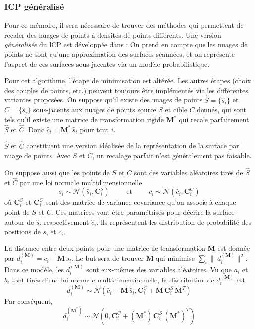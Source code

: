 \documentclass[a4paper,10pt]{scrreprt}
\begin{document}
\subsubsection{ICP généralisé}
Pour ce mémoire, il sera nécessaire de trouver des méthodes qui permettent de recaler des nuages de points à densités de points différents. Une version \emph{généralisée} du ICP est développée dans \cite{Sega2009}: On prend en compte que les nuages de points ne sont qu'une approximation des surfaces scannées, et on représente l'aspect de ces surfaces sous-jacentes via un modèle probabilistique.

Pour cet algorithme, l'étape de minimisation est altérée. Les autres étapes (choix des couples de points, etc.) peuvent toujours être implémentés via les différentes variantes proposées. On suppose qu'il existe des nuages de points $\hat{S} = \{ \hat{s}_i \}$ et $\hat{C} = \{ \hat{s}_i \}$ sous-jacents aux nuages de points source $S$ et cible $C$ donnés, qui sont tels qu'il existe une matrice de transformation rigide $\mathbf{M}^*$ qui recale parfaitement $\hat{S}$ et $\hat{C}$. Donc $\hat{c}_i = \mathbf{M}^* \, \hat{s}_i$ pour tout $i$.

$\hat{S}$ et $\hat{C}$ constituent une version idéalisée de la représentation de la surface par nuage de points. Avec $S$ et $C$, un recalage parfait n'est généralement pas faisable.

On suppose aussi que les points de $S$ et $C$ sont des variables aléatoires tirés de $\hat{S}$ et $\hat{C}$ par une loi normale multidimensionnelle
\begin{equation}
	s_i \sim \mathcal{N}(\hat{s}_i, \mathbf{C}^S_i)
	\hspace{1cm} \text{et} \hspace{1cm}
	c_i \sim \mathcal{N}(\hat{c}_i, \mathbf{C}^C_i)
\end{equation}
où $\mathbf{C}^S_i$ et $\mathbf{C}^C_i$ sont des matrice de variance-covariance qu'on associe à chaque point de $S$ et $C$. Ces matrices vont être paramétrisés pour décrire la surface autour de $\hat{s}_i$ respectivement $\hat{c}_i$. Ils représentent les distribution de probabilité des positions de $s_i$ et $c_i$.

La distance entre deux points pour une matrice de transformation $\mathbf{M}$ est donnée par $d^{(\mathbf{M})}_i = c_i - \mathbf{M} \, s_i$. Le but sera de trouver $\mathbf{M}$ qui minimise $\sum_{i} \|\ d^{(\mathbf{M})}_i \|^2$. Dans ce modèle, les $d^{(\mathbf{M})}_i$ sont eux-mêmes des variables aléatoires. Vu que $a_i$ et $b_i$ sont tirés d'une loi normale multidimensionnelle, la distribution de $d^{(\mathbf{M})}_i$ est
\begin{equation} \label{eq:dist_distr}
	d^{(\mathbf{M})}_i \sim \mathcal{N}(\hat{c}_i - \mathbf{M}\,\hat{s}_i, \mathbf{C}^C_i + \mathbf{M}\,\mathbf{C}^S_i\,\mathbf{M}^T)
\end{equation}
Par conséquent,
\begin{equation}
	d^{(\mathbf{M}^*)}_i \sim \mathcal{N}(0, \mathbf{C}^C_i + (\mathbf{M}^*)\,\mathbf{C}^S_i\,(\mathbf{M}^*)^T)
\end{equation}
\end{document}
